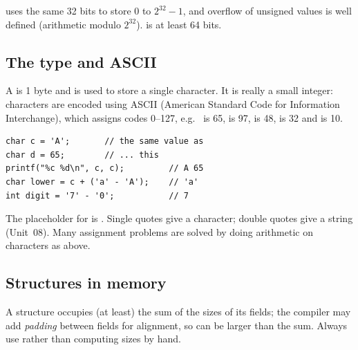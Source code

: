 \begin{center}
\end{center}

\begin{aside}
 uses the same 32 bits to store $0$ to $2^{32}-1$, and overflow of unsigned
values is well defined (arithmetic modulo $2^{32}$).  is at least 64 bits.
\end{aside}

\subsection{The  type and ASCII}

A  is 1 byte and is used to store a single character. It is really a small integer:
characters are encoded using ASCII (American Standard Code for Information Interchange), which
assigns codes 0--127, e.g.\  is 65,  is 97,  is 48,  is
32 and  is 10.
\begin{lstlisting}[style=c]
char c = 'A';       // the same value as
char d = 65;        // ... this
printf("%c %d\n", c, c);         // A 65
char lower = c + ('a' - 'A');    // 'a'
int digit = '7' - '0';           // 7
\end{lstlisting}
The placeholder for  is . Single quotes give a character; double quotes give
a string (Unit~08). Many assignment problems are solved by doing arithmetic on characters as
above.

\subsection{Structures in memory}

A structure occupies (at least) the sum of the sizes of its fields; the compiler may add
\emph{padding} between fields for alignment, so  can be larger than the
sum. Always use  rather than computing sizes by hand.

